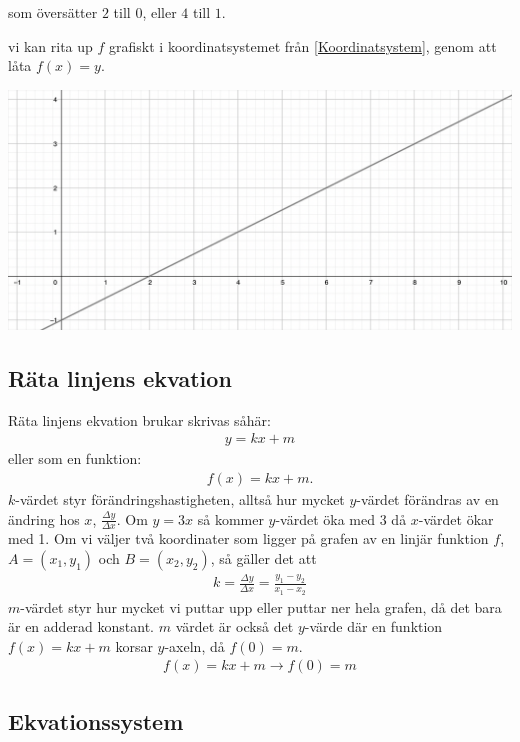 som översätter $2$ till $0$, eller $4$ till $1$.

vi kan rita up $f$ grafiskt i koordinatsystemet från \ref{Koordinatsystem}, genom att låta $f(x) = y$.

\includegraphics[width=\textwidth]{img/2.png}

\newpage
\subsection{Räta linjens ekvation}

Räta linjens ekvation brukar skrivas såhär:
\begin{align}
	y=kx+m
\end{align}
eller som en funktion:
\begin{align}
	f(x)=kx+m.
\end{align}
$k$-värdet styr förändringshastigheten, alltså hur mycket $y$-värdet förändras av en ändring hos $x$, $\frac{\Delta y}{\Delta x}$. Om $y = 3x$ så kommer $y$-värdet öka med $3$ då $x$-värdet ökar med 1. Om vi väljer två koordinater som ligger på grafen av en linjär funktion $f$, $A=(x_1,y_1)$ och $B=(x_2,y_2)$, så gäller det att
\begin{align}
	k = \frac{\Delta y}{\Delta x} = \frac{y_1-y_2}{x_1-x_2}
\end{align}
$m$-värdet styr hur mycket vi puttar upp eller puttar ner hela grafen, då det bara är en adderad konstant. $m$ värdet är också det $y$-värde där en funktion $f(x)=kx+m$ korsar $y$-axeln, då $f(0)=m$.
\begin{align*}
	f(x) = kx+m \rightarrow f(0) = m
\end{align*}

\newpage
\subsection{Ekvationssystem}

